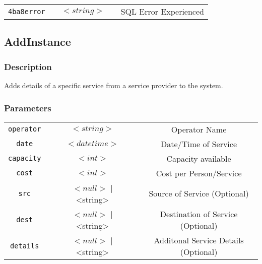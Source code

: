 \documentclass[a4paper,12pt]{article}
\begin{document}
\begin{tabular}{ccccc}
\verb!4ba8error! & \vspace{15mm} & $<string>$ & \vspace{15mm} & SQL Error Experienced \\
\end{tabular}


\subsection{AddInstance}

\subsubsection{Description}

Adds details of a specific service from a service provider to the
system.  

\subsubsection{Parameters}

\begin{tabular}{ccccc}
\verb!operator! & \vspace{15mm} & $<string>$ 	& \vspace{15mm} & Operator Name \\
\verb!date! 	 & \vspace{15mm} & $<datetime>$ & \vspace{15mm} & Date/Time of Service\\
\verb!capacity! & \vspace{15mm} & $<int>$ 		& \vspace{15mm} & Capacity available \\
\verb!cost! 	 & \vspace{15mm} & $<int>$ 		& \vspace{15mm} & Cost per Person/Service \\
\verb!src! 		 & \vspace{15mm} & $<null>$ | <string> & \vspace{15mm} & Source of Service (Optional) \\
\verb!dest! 	 & \vspace{15mm} & $<null>$ | <string> & \vspace{15mm} & Destination of Service (Optional) \\
\verb!details!  & \vspace{15mm} & $<null>$ | <string> & \vspace{15mm} & Additonal Service Details (Optional) \\
\end{tabular}
\end{document}
